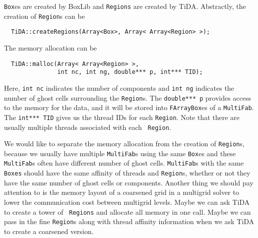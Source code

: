 {\tt Box}es are created by BoxLib and {\tt Regions} are created by
TiDA.  Abstractly, the creation of {\tt Region}s can be 
\begin{lstlisting}
  TiDA::createRegions(Array<Box>, Array< Array<Region> >);
\end{lstlisting}
The memory allocation can be
\begin{lstlisting}
  TiDA::malloc(Array< Array<Region> >, 
               int nc, int ng, double*** p, int*** TID);
\end{lstlisting}
Here, {\tt int nc} indicates the number of components and {\tt int ng}
indicates the number of ghost cells surrounding the {\tt Region}s.
The {\tt double*** p} provides access to the memory for the data, and
it will be stored into {\tt FArrayBox}es of a {\tt MultiFab}.  The
{\tt int*** TID} gives us the thread IDs for each {\tt Region}.  Note
that there are usually multiple threads associated with each {\tt
  Region}. 

We would like to separate the memory allocation from the creation of
{\tt Region}s, because we usually have multiple {\tt MultiFab}s using
the same {\tt Box}es and these {\tt MultiFab}s often have different
number of ghost cells.  {\tt MultiFab}s with the same {\tt Boxes}
should have the same affinity of threads and {\tt Region}s, whether or
not they have the same number of ghost cells or components.  Another
thing we should pay attention to is the memory layout of a coarsened
grid in a multigrid solver to lower the communication cost between
multigrid levels.  Maybe we can ask TiDA to create a tower of {\tt
  Regions} and allocate all memory in one call.  Maybe we can pass in
the fine {\tt Region}s along with thread affinity information when we
ask TiDA to create a coarsened version.
